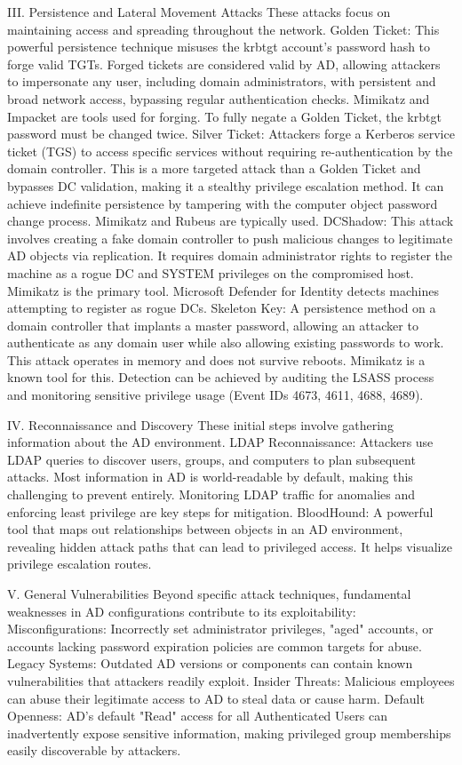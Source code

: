  III. Persistence and Lateral Movement Attacks 
These attacks focus on maintaining access and spreading throughout the network.
Golden Ticket:  This powerful persistence technique misuses the krbtgt account's password hash to forge valid TGTs. Forged tickets are considered valid by AD, allowing attackers to impersonate any user, including domain administrators, with persistent and broad network access, bypassing regular authentication checks. Mimikatz and Impacket are tools used for forging. To fully negate a Golden Ticket, the krbtgt password must be changed twice.
Silver Ticket:  Attackers forge a Kerberos service ticket (TGS) to access specific services without requiring re-authentication by the domain controller. This is a more targeted attack than a Golden Ticket and bypasses DC validation, making it a stealthy privilege escalation method. It can achieve indefinite persistence by tampering with the computer object password change process. Mimikatz and Rubeus are typically used.
DCShadow:  This attack involves creating a fake domain controller to push malicious changes to legitimate AD objects via replication. It requires domain administrator rights to register the machine as a rogue DC and SYSTEM privileges on the compromised host. Mimikatz is the primary tool. Microsoft Defender for Identity detects machines attempting to register as rogue DCs.
Skeleton Key:  A persistence method on a domain controller that implants a master password, allowing an attacker to authenticate as any domain user while also allowing existing passwords to work. This attack operates in memory and does not survive reboots. Mimikatz is a known tool for this. Detection can be achieved by auditing the LSASS process and monitoring sensitive privilege usage (Event IDs 4673, 4611, 4688, 4689).

IV. Reconnaissance and Discovery 
These initial steps involve gathering information about the AD environment.
LDAP Reconnaissance:  Attackers use LDAP queries to discover users, groups, and computers to plan subsequent attacks. Most information in AD is world-readable by default, making this challenging to prevent entirely. Monitoring LDAP traffic for anomalies and enforcing least privilege are key steps for mitigation.
BloodHound: A powerful tool that maps out relationships between objects in an AD environment, revealing hidden attack paths that can lead to privileged access. It helps visualize privilege escalation routes.

V. General Vulnerabilities
Beyond specific attack techniques, fundamental weaknesses in AD configurations contribute to its exploitability:
Misconfigurations: Incorrectly set administrator privileges, "aged" accounts, or accounts lacking password expiration policies are common targets for abuse.
Legacy Systems: Outdated AD versions or components can contain known vulnerabilities that attackers readily exploit.
Insider Threats: Malicious employees can abuse their legitimate access to AD to steal data or cause harm.
Default Openness: AD's default "Read" access for all Authenticated Users can inadvertently expose sensitive information, making privileged group memberships easily discoverable by attackers.

